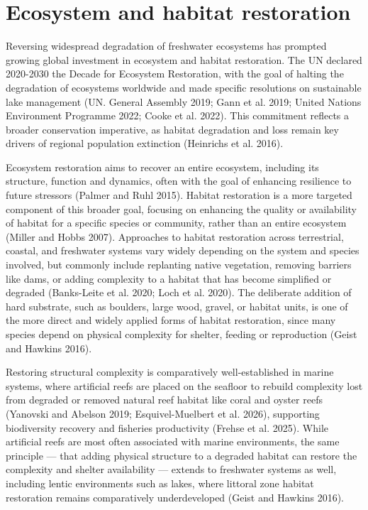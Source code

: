 \documentclass[
  12pt,
  a4paper,
  oneside]{scrbook}
\begin{document}
\section{Ecosystem and habitat
restoration}\label{ecosystem-and-habitat-restoration}

Reversing widespread degradation of freshwater ecosystems has prompted
growing global investment in ecosystem and habitat restoration. The UN
declared 2020-2030 the Decade for Ecosystem Restoration, with the goal
of halting the degradation of ecosystems worldwide and made specific
resolutions on sustainable lake management (UN. General Assembly 2019;
Gann et al. 2019; United Nations Environment Programme 2022; Cooke et
al. 2022). This commitment reflects a broader conservation imperative,
as habitat degradation and loss remain key drivers of regional
population extinction (Heinrichs et al. 2016).

Ecosystem restoration aims to recover an entire ecosystem, including its
structure, function and dynamics, often with the goal of enhancing
resilience to future stressors (Palmer and Ruhl 2015). Habitat
restoration is a more targeted component of this broader goal, focusing
on enhancing the quality or availability of habitat for a specific
species or community, rather than an entire ecosystem (Miller and Hobbs
2007). Approaches to habitat restoration across terrestrial, coastal,
and freshwater systems vary widely depending on the system and species
involved, but commonly include replanting native vegetation, removing
barriers like dams, or adding complexity to a habitat that has become
simplified or degraded (Banks-Leite et al. 2020; Loch et al. 2020). The
deliberate addition of hard substrate, such as boulders, large wood,
gravel, or habitat units, is one of the more direct and widely applied
forms of habitat restoration, since many species depend on physical
complexity for shelter, feeding or reproduction (Geist and Hawkins
2016).

Restoring structural complexity is comparatively well-established in
marine systems, where artificial reefs are placed on the seafloor to
rebuild complexity lost from degraded or removed natural reef habitat
like coral and oyster reefs (Yanovski and Abelson 2019;
Esquivel-Muelbert et al. 2026), supporting biodiversity recovery and
fisheries productivity (Frehse et al. 2025). While artificial reefs are
most often associated with marine environments, the same principle ---
that adding physical structure to a degraded habitat can restore the
complexity and shelter availability --- extends to freshwater systems as
well, including lentic environments such as lakes, where littoral zone
habitat restoration remains comparatively underdeveloped (Geist and
Hawkins 2016).
\end{document}
